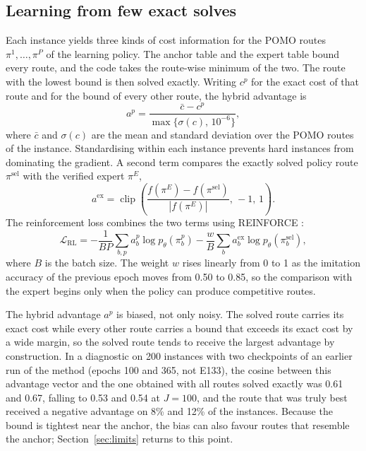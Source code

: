 \documentclass[preprint,12pt,authoryear]{elsarticle}
\begin{document}
\subsection{Learning from few exact solves}
\label{sec:learning}

Each instance yields three kinds of cost information for the POMO routes $\pi^{1},\dots,\pi^{P}$ of the learning policy. The anchor table and the expert table bound every route, and the code takes the route-wise minimum of the two. The route with the lowest bound is then solved exactly. Writing $c^{p}$ for the exact cost of that route and for the bound of every other route, the hybrid advantage is
\begin{equation}
a^{p} = \frac{\bar{c} - c^{p}}{\max\{\sigma(c),\, 10^{-6}\}},
\end{equation}
where $\bar{c}$ and $\sigma(c)$ are the mean and standard deviation over the POMO routes of the instance. Standardising within each instance prevents hard instances from dominating the gradient. A second term compares the exactly solved policy route $\pi^{\mathrm{sel}}$ with the verified expert $\pi^{E}$,
\begin{equation}
a^{\mathrm{ex}} = \operatorname{clip}\!\left(\frac{f(\pi^{E}) - f(\pi^{\mathrm{sel}})}{|f(\pi^{E})|},\, -1,\, 1\right).
\end{equation}
The reinforcement loss combines the two terms using REINFORCE \citep{williams1992}:
\begin{equation}
\mathcal{L}_{\mathrm{RL}} = -\frac{1}{BP}\sum_{b,p} a^{p}_{b} \log p_{\theta}(\pi^{p}_{b}) - \frac{w}{B} \sum_{b} a^{\mathrm{ex}}_{b} \log p_{\theta}(\pi^{\mathrm{sel}}_{b}),
\end{equation}
where $B$ is the batch size. The weight $w$ rises linearly from 0 to 1 as the imitation accuracy of the previous epoch moves from 0.50 to 0.85, so the comparison with the expert begins only when the policy can produce competitive routes.

The hybrid advantage $a^{p}$ is biased, not only noisy. The solved route carries its exact cost while every other route carries a bound that exceeds its exact cost by a wide margin, so the solved route tends to receive the largest advantage by construction. In a diagnostic on 200 instances with two checkpoints of an earlier run of the method (epochs 100 and 365, not E133), the cosine between this advantage vector and the one obtained with all routes solved exactly was 0.61 and 0.67, falling to 0.53 and 0.54 at $J = 100$, and the route that was truly best received a negative advantage on 8\% and 12\% of the instances. Because the bound is tightest near the anchor, the bias can also favour routes that resemble the anchor; Section~\ref{sec:limits} returns to this point.
\end{document}
